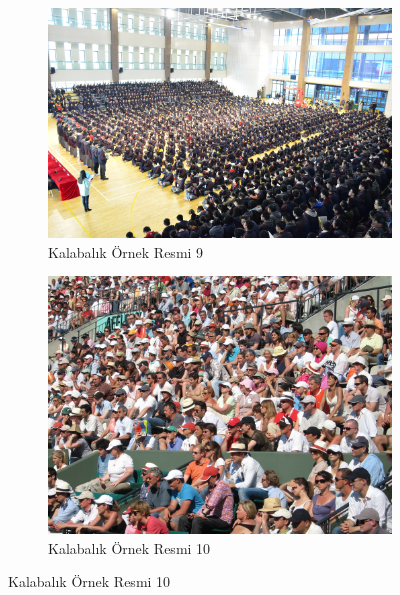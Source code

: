 \documentclass[10pt,a4paper]{report}
\begin{document}
		\begin{figure}[!h]
		\begin{subfigure}{\textwidth}
			\raggedright
			\includegraphics[width=\textwidth]{NPWU3}
			\caption{Kalabalık Örnek Resmi 9 \cite{wang2020nwpu}}
			\label{Ornek5}
		\end{subfigure}
		\begin{subfigure}{\textwidth}
			\raggedright
			\includegraphics[width=\textwidth]{QNRF3}
			\caption{Kalabalık Örnek Resmi 10  \cite{2018composition2}}
			\label{Ornek6}
		\end{subfigure}
	\end{figure}
	

	
	
	\clearpage
	
\end{document}
